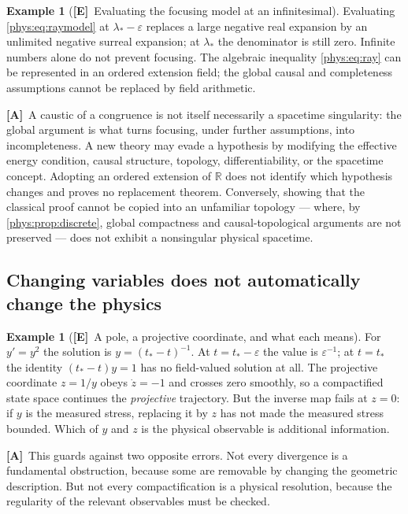 \documentclass[11pt,letterpaper]{article}
\numberwithin{equation}{section}
\theoremstyle{definition}
\newtheorem{example}[theorem]{Example}
\theoremstyle{remark}
\newcommand{\R}{\mathbb R}
\newcommand{\eps}{\varepsilon}
\newcommand{\TE}{\textcolor{TierE}{\textsf{\bfseries[E]}}}
\newcommand{\TA}{\textcolor{TierA}{\textsf{\bfseries[A]}}}
\begin{document}
\begin{example}[\TE\ Evaluating the focusing model at an infinitesimal]
\label{phys:ex:ray}
Evaluating \eqref{phys:eq:raymodel} at $\lambda_{*}-\eps$ replaces a large
negative real expansion by an unlimited negative surreal expansion; at
$\lambda_{*}$ the denominator is still zero. Infinite numbers alone do not
prevent focusing. The algebraic inequality \eqref{phys:eq:ray} can be
represented in an ordered extension field; the global causal and completeness
assumptions cannot be replaced by field arithmetic.
\end{example}

\TA\ A caustic of a congruence is not itself necessarily a spacetime
singularity: the global argument is what turns focusing, under further
assumptions, into incompleteness. A new theory may evade a hypothesis by
modifying the effective energy condition, causal structure, topology,
differentiability, or the spacetime concept. Adopting an ordered extension of
$\R$ does not identify which hypothesis changes and proves no replacement
theorem. Conversely, showing that the classical proof cannot be copied into an
unfamiliar topology --- where, by \cref{phys:prop:discrete}, global
compactness and causal-topological arguments are not preserved --- does not
exhibit a nonsingular physical spacetime.

\subsection{Changing variables does not automatically change the physics}
\label{phys:sub:changevars}

\begin{example}[\TE\ A pole, a projective coordinate, and what each means]
\label{phys:ex:projective}
For $y'=y^{2}$ the solution is $y=(t_{*}-t)^{-1}$. At $t=t_{*}-\eps$ the value
is $\eps^{-1}$; at $t=t_{*}$ the identity $(t_{*}-t)y=1$ has no field-valued
solution at all. The projective coordinate $z=1/y$ obeys $\dot z=-1$ and
crosses zero smoothly, so a compactified state space continues the
\emph{projective} trajectory. But the inverse map fails at $z=0$: if $y$ is the
measured stress, replacing it by $z$ has not made the measured stress
bounded. Which of $y$ and $z$ is the physical observable is additional
information.
\end{example}

\TA\ This guards against two opposite errors. Not every divergence is a
fundamental obstruction, because some are removable by changing the geometric
description. But not every compactification is a physical resolution, because
the regularity of the relevant observables must be checked.
\end{document}
